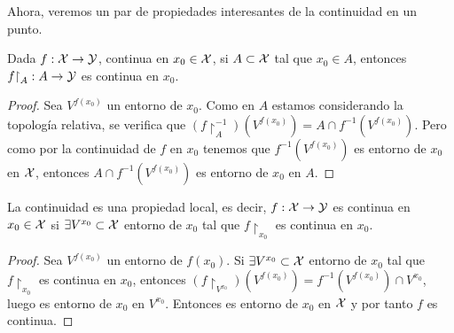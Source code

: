 Ahora, veremos un par de propiedades interesantes de la continuidad en un punto.

\begin{prop}
	Dada $f:\mathcal{X}\to\mathcal{Y}$, continua en $x_0\in\mathcal{X}$, si $A\subset\mathcal{X}$ tal que $x_0\in A$, entonces $f\mathord{\upharpoonright}_A:A\to\mathcal{Y}$ es continua en $x_0$.
	
	\begin{proof}
		Sea $V^{f(x_0)}$ un entorno de $x_0$. Como en $A$ estamos considerando la topología relativa, se verifica que $(f\restriction_A^{-1})(V^{f(x_0)}) = A\cap f^{-1}(V^{f(x_0)})$. Pero como por la continuidad de $f$ en $x_0$ tenemos que $f^{-1}(V^{f(x_0)})$ es entorno de $x_0$ en $\mathcal{X}$, entonces $A\cap f^{-1}(V^{f(x_0)})$ es entorno de $x_0$ en $A$.
	\end{proof}
\end{prop}

\begin{prop}
	La continuidad es una propiedad local, es decir, $f:\mathcal{X}\to\mathcal{Y}$ es continua en $x_0\in\mathcal{X}$ si $\exists V^{x_0}\subset\mathcal{X}$ entorno de $x_0$ tal que $f\restriction_{x_0}$ es continua en $x_0$.
	
	\begin{proof}
		Sea $V^{f(x_0)}$ un entorno de $f(x_0)$. Si $\exists V^{x_0}\subset\mathcal{X}$ entorno de $x_0$ tal que $f\restriction_{x_0}$ es continua en $x_0$, entonces $(f\restriction_{V^{x_0}})(V^{f(x_0)}) = f^{-1}(V^{f(x_0)})\cap V^{x_0}$, luego es entorno de $x_0$ en $V^{x_0}$. Entonces es entorno de $x_0$ en $\mathcal{X}$ y por tanto $f$ es continua.
	\end{proof}
\end{prop}